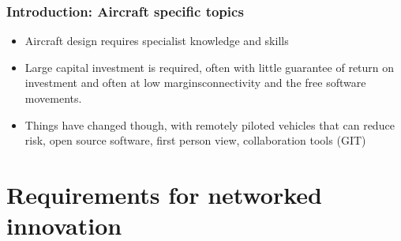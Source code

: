 \documentclass{beamer}
\begin{document}
\begin{frame}
\frametitle{Introduction:  Aircraft specific topics}

\begin{itemize}
\item Aircraft design requires specialist knowledge and skills  
\item Large capital investment is required, often with little guarantee of return on investment and often at low marginsconnectivity and the free software movements.
\item Things have changed though, with remotely piloted vehicles that can reduce risk, open source software, first person view, collaboration tools (GIT)
\end{itemize}

\end{frame}

\section{Requirements for networked innovation} 
\end{document}
